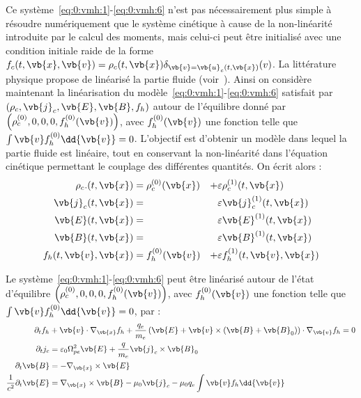 Ce système~\eqref{eq:0:vmh:1}-\eqref{eq:0:vmh:6} n'est pas nécessairement plus simple à résoudre numériquement que le système cinétique à cause de la non-linéarité introduite par le calcul des moments, mais celui-ci peut être initialisé avec une condition initiale raide de la forme $f_c(t,\vb{x},\vb{v}) = \rho_c(t,\vb{x})\delta_{\vb{v}=\vb{u}_c(t,\vb{x})}(v)$. La littérature physique propose de linéarisé la partie fluide (voir~\cite{Holderied:2019}). Ainsi on considère maintenant la linéarisation du modèle~\eqref{eq:0:vmh:1}-\eqref{eq:0:vmh:6} satisfait par $(\rho_c,\vb{j}_c,\vb{E},\vb{B},f_h)$ autour de l'équilibre donné par $\left(\rho_c^{(0)},0,0,0,f_h^{(0)}(\vb{v})\right)$, avec $f_h^{(0)}(\vb{v})$ une fonction telle que $\int\vb{v}f_h^{(0)}\dd{\vb{v}} = 0$. L'objectif est d'obtenir un modèle dans lequel la partie fluide est linéaire, tout en conservant la non-linéarité dans l'équation cinétique permettant le couplage des différentes quantités. On écrit alors :
\begin{equation}
  \begin{aligned}
    \rho_c. (t,\vb{x}) &= \rho_c^{(0)}(\vb{x}) & + & \varepsilon\rho_c^{(1)}(t,\vb{x}) \\
    \vb{j}_c(t,\vb{x}) &=                      &   & \varepsilon\vb{j}_c^{(1)}(t,\vb{x}) \\
    \vb{E}  (t,\vb{x}) &=                      &   & \varepsilon\vb{E}^{(1)}(t,\vb{x}) \\
    \vb{B}  (t,\vb{x}) &=                      &   & \varepsilon\vb{B}^{(1)}(t,\vb{x}) \\
    f_h(t,\vb{v},\vb{x}) &= f_h^{(0)}(\vb{v})  & + & \varepsilon f_h^{(1)}(t,\vb{v},\vb{x})
  \end{aligned}
  \label{eq:0:linear}
\end{equation}

\begin{pro}
  \label{pro:0:vmhl}
  Le système~\eqref{eq:0:vmh:1}-\eqref{eq:0:vmh:6} peut être linéarisé autour de l'état d'équilibre $\left(\rho_c^{(0)},0,0,0,f_h^{(0)}(\vb{v})\right)$, avec $f_h^{(0)}(\vb{v})$ une fonction telle que $\int\vb{v}f_h^{(0)}\dd{\vb{v}} = 0$, par :
  \begin{align}
    \label{eq:0:vmhl:1}
      \partial_t f_h &+ \vb{v}\cdot\nabla_{\vb{x}} f_h + \frac{q_e}{m_e}\left( \vb{E} + \vb{v}\times(\vb{B}+\vb{B}_0) \right)\cdot\nabla_{\vb{v}} f_h = 0 \\
    \label{eq:0:vmhl:2}
      \partial_t j_c &= \varepsilon_0\Omega_{pe}^2\vb{E} + \frac{q}{m_e}\vb{j}_c\times\vb{B}_0 \\
    \label{eq:0:vmhl:3}
      \partial_t\vb{B} &= -\nabla_{\vb{x}}\times\vb{E} \\
    \label{eq:0:vmhl:4}
      \frac{1}{c^2}\partial_t\vb{E} &= \nabla_{\vb{x}}\times\vb{B} - \mu_0\vb{j}_c - \mu_0q_e\int\vb{v}f_h\dd{\vb{v}}
  \end{align}
\end{pro}

